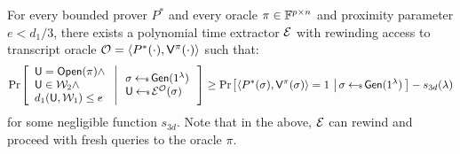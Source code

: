\begin{lemma}[Soundness]\label{lem:proximity3d_sound}
For every bounded prover $P^\ast$ and every oracle $\pi\in \mathbb{F}^{p\times n}$ and 
proximity parameter $e<d_1/3$,
there exists a polynomial time extractor $\mathcal{E}$ with rewinding access to
transcript oracle $\mathcal{O}=\langle P^\ast(\cdot),\mathsf{V}^{\pi}(\cdot)\rangle$
such that:
{\small
\begin{align*}
\condprob{
\begin{array}{l}
\ewit=\open(\pi) \wedge \\
\ewit\in \mc{W}_2\wedge \\
d_1(\ewit,\mc{W}_1)\leq e
\end{array}
}{
\begin{array}{l}
\sigma\sample \gen(\secparam)\\
\ewit\sample \extr^{\mc{O}}(\sigma)
\end{array}
}\geq \condprob{\langle
P^\ast(\sigma),\verifier^\pi(\sigma)\rangle=1}{\sigma\sample
\gen(\secparam)}-s_{3d}(\secpar)
\end{align*}
}
for some negligible function $s_{3d}$. Note that in the above, $\mathcal{E}$ can
rewind and proceed with fresh queries to the oracle $\pi$. 	
\end{lemma}
